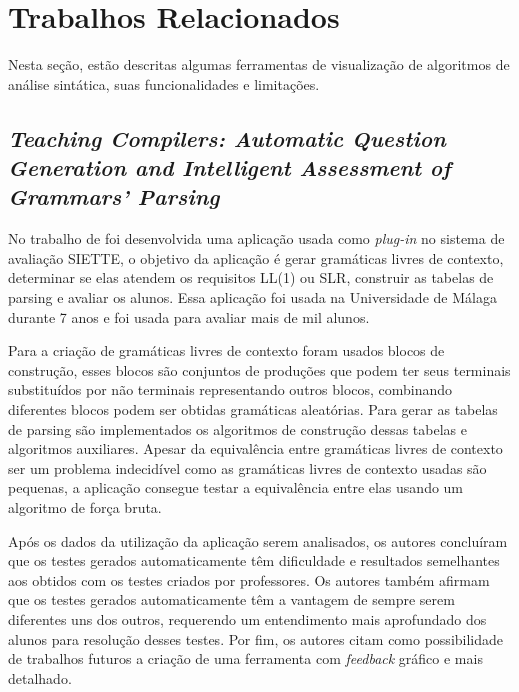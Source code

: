 \chapter{Trabalhos Relacionados}
\label{cap:trabalhos-relacionados}

Nesta seção, estão descritas algumas ferramentas de visualização de algoritmos de análise sintática, suas funcionalidades e limitações.

\section{\textit{Teaching Compilers: Automatic Question Generation and Intelligent Assessment of Grammars' Parsing}}
No trabalho de \textcite{munozquestions} foi desenvolvida uma aplicação usada como \textit{plug-in} no sistema de avaliação SIETTE, o objetivo da aplicação é gerar gramáticas livres de contexto, determinar se elas atendem os requisitos LL(1) ou SLR, construir as tabelas de parsing e avaliar os alunos. Essa aplicação foi usada na Universidade de Málaga durante 7 anos e foi usada para avaliar mais de mil alunos.

Para a criação de gramáticas livres de contexto foram usados blocos de construção, esses blocos são conjuntos de produções que podem ter seus terminais substituídos por não terminais representando outros blocos, combinando diferentes blocos podem ser obtidas gramáticas aleatórias. Para gerar as tabelas de parsing são implementados os algoritmos de construção dessas tabelas e algoritmos auxiliares. Apesar da equivalência entre gramáticas livres de contexto ser um problema indecidível como as gramáticas livres de contexto usadas são pequenas, a aplicação consegue testar a equivalência entre elas usando um algoritmo de força bruta.

Após os dados da utilização da aplicação serem analisados, os autores concluíram que os testes gerados automaticamente têm dificuldade e resultados semelhantes aos obtidos com os testes criados por professores. Os autores também afirmam que os testes gerados automaticamente têm a vantagem de sempre serem diferentes uns dos outros, requerendo um entendimento mais aprofundado dos alunos para resolução desses testes. Por fim, os autores citam como possibilidade de trabalhos futuros a criação de uma ferramenta com \textit{feedback} gráfico e mais detalhado.



